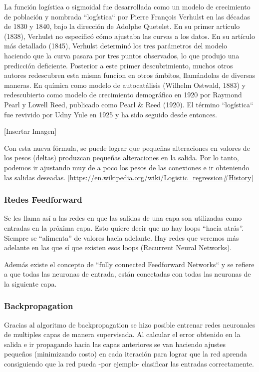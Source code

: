 \documentclass[a4paper]{article}
\begin{document}
La función logística o sigmoidal fue desarrollada como un modelo de crecimiento de población y nombrada ``logística`` por Pierre François Verhulst en las décadas de 1830 y 1840, bajo la dirección de Adolphe Quetelet.
En su primer artículo (1838), Verhulst no especificó cómo ajustaba las curvas a los datos. En su artículo más detallado (1845), Verhulst determinó los tres parámetros del modelo haciendo que la curva pasara por tres puntos observados, lo que produjo una predicción deficiente.
Posterior a este primer descubrimiento, muchos otros autores
 redescubren esta misma funcion en otros ámbitos, llamándolas de
  diversas maneras. En química como modelo de autocatálisis (Wilhelm Ostwald, 1883) y redescubierto como modelo de crecimiento
   demográfico en 1920 por Raymond Pearl y Lowell Reed, publicado como Pearl \& Reed (1920). El término ``logística`` fue revivido por Udny Yule en 1925 y ha sido seguido desde entonces.

[Insertar Imagen]

Con esta nueva fórmula, se puede lograr que pequeñas alteraciones en valores de los pesos (deltas) produzcan pequeñas alteraciones en la salida. Por lo tanto, podemos ir ajustando muy de a poco los pesos de las conexiones e ir obteniendo las salidas deseadas.
[\url{https://en.wikipedia.org/wiki/Logistic_regression#History}]

\subsubsection{Redes Feedforward}

Se les llama así a las redes en que las salidas de una capa son utilizadas como entradas en la próxima capa. Esto quiere decir que no hay loops “hacia atrás”. Siempre se “alimenta” de valores hacia adelante. Hay redes que veremos más adelante en las que sí que existen esos loops (Recurrent Neural Networks).

Además existe el concepto de ``fully connected Feedforward Networks`` y se refiere a que todas las neuronas de entrada, están conectadas con todas las neuronas de la siguiente capa.

\subsubsection{Backpropagation}

Gracias al algoritmo de backpropagation se hizo posible entrenar redes neuronales de multiples capas de manera supervisada. Al calcular el error obtenido en la salida e ir propagando hacia las capas anteriores se van haciendo ajustes pequeños (minimizando costo) en cada iteración para lograr que la red aprenda consiguiendo que la red pueda -por ejemplo- clasificar las entradas correctamente.
\end{document}
